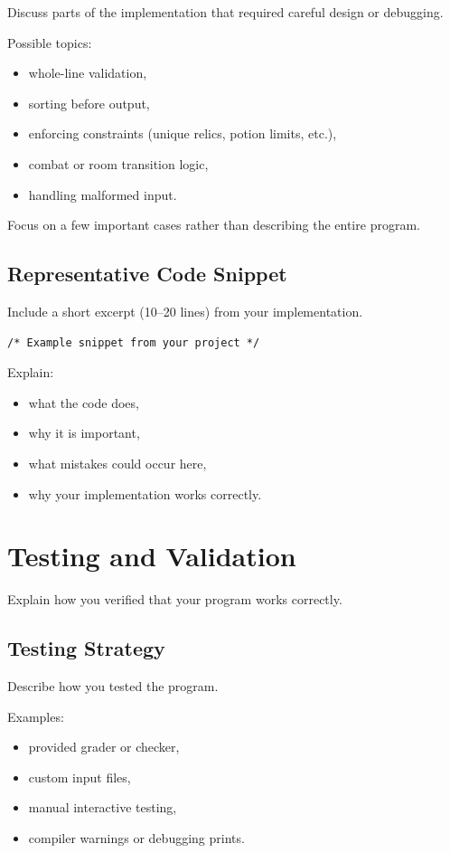 \documentclass[a4paper,12pt]{article}
\begin{document}
Discuss parts of the implementation that required careful design or debugging.

Possible topics:
\begin{itemize}[leftmargin=1.5em]
\item whole-line validation,
\item sorting before output,
\item enforcing constraints (unique relics, potion limits, etc.),
\item combat or room transition logic,
\item handling malformed input.
\end{itemize}

Focus on a few important cases rather than describing the entire program.

\subsection{Representative Code Snippet}

Include a short excerpt (10--20 lines) from your implementation.

\begin{lstlisting}[style=CStyle]
/* Example snippet from your project */
\end{lstlisting}

Explain:
\begin{itemize}[leftmargin=1.5em]
\item what the code does,
\item why it is important,
\item what mistakes could occur here,
\item why your implementation works correctly.
\end{itemize}

\section{Testing and Validation}

Explain how you verified that your program works correctly.

\subsection{Testing Strategy}

Describe how you tested the program.

Examples:
\begin{itemize}[leftmargin=1.5em]
\item provided grader or checker,
\item custom input files,
\item manual interactive testing,
\item compiler warnings or debugging prints.
\end{itemize}
\end{document}
